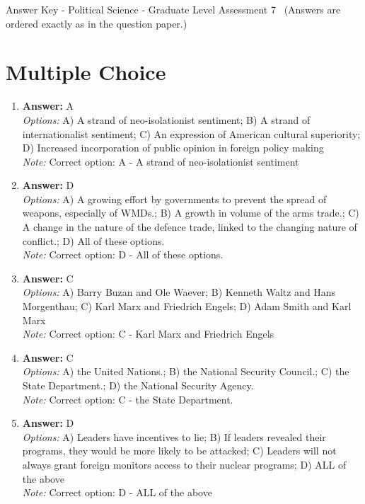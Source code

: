 \documentclass[12pt]{article}
\begin{document}
\begin{center}
Answer Key - Political Science - Graduate Level Assessment 7 \
\small (Answers are ordered exactly as in the question paper.)
\end{center}

\section*{Multiple Choice}
\begin{enumerate}[label=\arabic*.]
\item \textbf{Answer:} A
\\ \textit{Options:} A) A strand of neo-isolationist sentiment; B) A strand of internationalist sentiment; C) An expression of American cultural superiority; D) Increased incorporation of public opinion in foreign policy making
\\ \textit{Note:} Correct option: A - A strand of neo-isolationist sentiment
\item \textbf{Answer:} D
\\ \textit{Options:} A) A growing effort by governments to prevent the spread of weapons, especially of WMDs.; B) A growth in volume of the arms trade.; C) A change in the nature of the defence trade, linked to the changing nature of conflict.; D) All of these options.
\\ \textit{Note:} Correct option: D - All of these options.
\item \textbf{Answer:} C
\\ \textit{Options:} A) Barry Buzan and Ole Waever; B) Kenneth Waltz and Hans Morgenthau; C) Karl Marx and Friedrich Engels; D) Adam Smith and Karl Marx
\\ \textit{Note:} Correct option: C - Karl Marx and Friedrich Engels
\item \textbf{Answer:} C
\\ \textit{Options:} A) the United Nations.; B) the National Security Council.; C) the State Department.; D) the National Security Agency.
\\ \textit{Note:} Correct option: C - the State Department.
\item \textbf{Answer:} D
\\ \textit{Options:} A) Leaders have incentives to lie; B) If leaders revealed their programs, they would be more likely to be attacked; C) Leaders will not always grant foreign monitors access to their nuclear programs; D) ALL of the above
\\ \textit{Note:} Correct option: D - ALL of the above
\end{enumerate}
\end{document}
